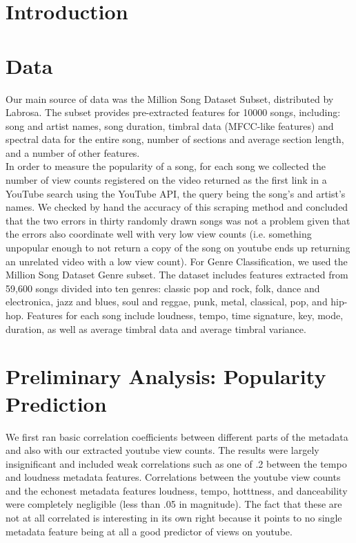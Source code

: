 \documentclass[12pt]{amsart}
\begin{document}
\begin{multicols}{2}

\section{Introduction}

\section{Data}
Our main source of data was the Million Song Dataset Subset, distributed by Labrosa. The subset provides pre-extracted features for 10000 songs, including: song and artist names, song duration, timbral data (MFCC-like features) and spectral data for the entire song, number of sections and average section length, and a number of other features.
\\ In order to measure the popularity of a song, for each song we collected the number of view counts registered on the video returned as the first link in a YouTube search using the YouTube API, the query being the song's and artist's names.  We checked by hand the accuracy
of this scraping method and concluded that the two errors in thirty randomly drawn songs
was not a problem given that the errors also coordinate well with very low view counts (i.e.
something unpopular enough to not return a copy of the song on youtube ends up returning
an unrelated video with a low view count).
For Genre Classification, we used the Million Song Dataset Genre subset. The dataset includes features extracted from 59,600 songs divided into ten genres: classic pop and rock, folk, dance and electronica, jazz and blues, soul and reggae, punk, metal, classical, pop, and hip-hop. Features for each song include loudness, tempo, time signature, key, mode, duration, as well as average timbral data and average timbral variance. 
\section{Preliminary Analysis: Popularity Prediction}
 We first ran basic correlation coefficients between different parts of the metadata and also with our extracted youtube view counts. The results were largely insignificant and included weak correlations such as one of .2 between the tempo and loudness metadata features. Correlations between the youtube view counts and the echonest metadata features loudness, tempo, hotttness, and danceability were completely negligible (less than .05 in magnitude). The fact that these are not at all correlated is interesting in its own right because it points to no single metadata feature being at all a good predictor of views on youtube.

\end{multicols}
\end{document}
